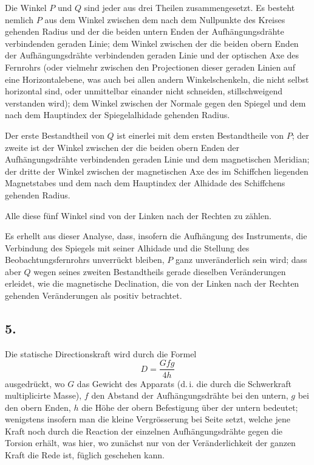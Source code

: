 \documentclass[12pt,a4paper]{article}
\begin{document}
Die Winkel $P$ und $Q$ sind jeder aus drei Theilen zusammengesetzt. Es besteht nemlich $P$ aus dem Winkel zwischen dem nach dem Nullpunkte des Kreises gehenden Radius und der die beiden untern Enden der Aufhängungsdrähte verbindenden geraden Linie; dem Winkel zwischen der die beiden obern Enden der Aufhängungsdrähte verbindenden geraden Linie und der optischen Axe des Fernrohrs (oder vielmehr zwischen den Projectionen dieser geraden Linien auf eine Horizontalebene, was auch bei allen andern Winkelschenkeln, die nicht selbst horizontal sind, oder unmittelbar einander nicht schneiden, stillschweigend verstanden wird); dem Winkel zwischen der Normale gegen den Spiegel und dem nach dem Hauptindex der Spiegelalhidade gehenden Radius.

Der erste Bestandtheil von $Q$ ist einerlei mit dem ersten Bestandtheile von $P$; der zweite ist der Winkel zwischen der die beiden obern Enden der Aufhängungsdrähte verbindenden geraden Linie und dem magnetischen Meridian; der dritte der Winkel zwischen der magnetischen Axe des im Schiffchen liegenden Magnetstabes und dem nach dem Hauptindex der Alhidade des Schiffchens gehenden Radius.

Alle diese fünf Winkel sind von der Linken nach der Rechten zu zählen.

Es erhellt aus dieser Analyse, dass, insofern die Aufhängung des Instruments, die Verbindung des Spiegels mit seiner Alhidade und die Stellung des Beobachtungsfernrohrs unverrückt bleiben, $P$ ganz unveränderlich sein wird; dass aber $Q$ wegen seines zweiten Bestandtheils gerade dieselben Veränderungen erleidet, wie die magnetische Declination, die von der Linken nach der Rechten gehenden Veränderungen als positiv betrachtet.

\newpage
\subsection*{5.}

Die statische Directionskraft wird durch die Formel
\begin{equation}
D = \frac{Gfg}{4h}
\end{equation}
ausgedrückt, wo $G$ das Gewicht des Apparats (d.\,i. die durch die Schwerkraft multiplicirte Masse), $f$ den Abstand der Aufhängungsdrähte bei den untern, $g$ bei den obern Enden, $h$ die Höhe der obern Befestigung über der untern bedeutet; wenigstens insofern man die kleine Vergrösserung bei Seite setzt, welche jene Kraft noch durch die Reaction der einzelnen Aufhängungsdrähte gegen die Torsion erhält, was hier, wo zunächst nur von der Veränderlichkeit der ganzen Kraft die Rede ist, füglich geschehen kann.
\end{document}
